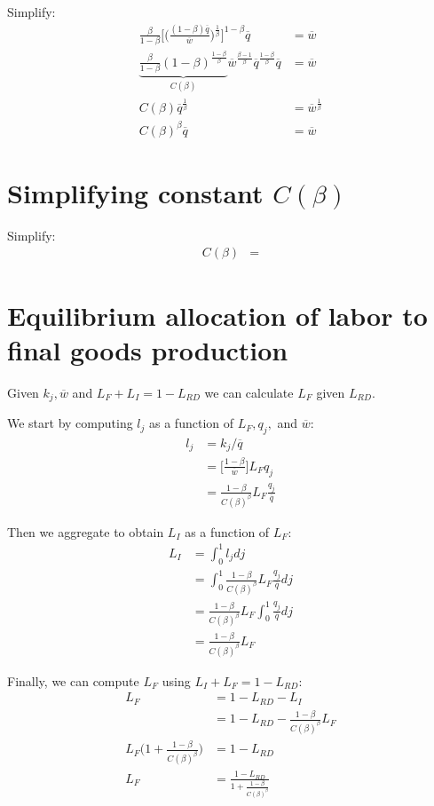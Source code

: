 \documentclass[12pt,english]{article}
\theoremstyle{remark}
\begin{document}
Simplify:
\begin{align*}
	\frac{\beta}{1-\beta} \Big[ \Big( \frac{(1-\beta) \overline{q}}{\overline{w}}\Big)^{\frac{1}{\beta}} \Big]^{1-\beta} \overline{q} &= \overline{w} \\
	\underbrace{\frac{\beta}{1-\beta} (1-\beta)^{\frac{1-\beta}{\beta}}}_{C(\beta)} \overline{w}^{\frac{\beta-1}{\beta}} \overline{q}^{\frac{1-\beta}{\beta}} \overline{q} &= \overline{w} \\
	C(\beta) \overline{q}^{\frac{1}{\beta}} &= \overline{w}^{\frac{1}{\beta}} \\
	C(\beta)^{\beta} \overline{q} &= \overline{w}
\end{align*}

\section{Simplifying constant $C(\beta)$}

Simplify:
\begin{align*}
	C(\beta) &= 
\end{align*}

\section{Equilibrium allocation of labor to final goods production}
Given $k_j,\overline{w}$ and $L_F + L_I  = 1 - L_{RD}$ we can calculate $L_F$ given $L_{RD}$. 

We start by computing $l_j$ as a function of $L_F, q_j,$ and $\overline{w}$:
\begin{align*}
	l_j &= k_j / \overline{q} \\
		&=  \Big[ \frac{1-\beta}{\overline{w}} \Big]L_F   q_j \\
		&= \frac{1-\beta}{C(\beta)^{\beta}} L_F \frac{q_j}{\overline{q}}
\end{align*}

Then we aggregate to obtain $L_I$ as a function of $L_F$:
\begin{align*}
	L_I &= \int_0^1 l_j dj \\
	    &= \int_0^1 \frac{1-\beta}{C(\beta)^{\beta}} L_F \frac{q_j}{\overline{q}} dj \\
	    &= \frac{1-\beta}{C(\beta)^{\beta}} L_F \int_0^1 \frac{q_j}{\overline{q}} dj \\
	    &= \frac{1-\beta}{C(\beta)^{\beta}} L_F 
\end{align*}

Finally, we can compute $L_F$ using $L_I + L_F = 1 - L_{RD}$: 
\begin{align*}
	L_F &= 1 - L_{RD} - L_I \\
	    &= 1 - L_{RD} - \frac{1-\beta}{C(\beta)^{\beta}} L_F \\
	L_F \Big( 1 +  \frac{1-\beta}{C(\beta)^{\beta}} \Big) &= 1 - L_{RD} \\
	L_F &= \frac{1 - L_{RD}}{1 +  \frac{1-\beta}{C(\beta)^{\beta}}}
\end{align*}
\end{document}
